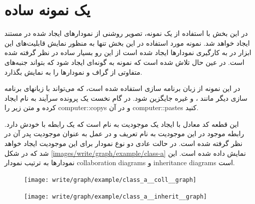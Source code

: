 % 
% 
% 
\section{یک نمونه ساده}

در این بخش با استفاده از یک نمونه، تصویر روشنی از نمودارهای ایجاد شده در مستند
ایجاد خواهد شد. نمونه مورد استفاده در این بخش تنها به منظور نمایش قابلیت‌های این
ابزار در به کارگیری نمودارها ایجاد شده است از این رو بسیار ساده در نظر گرفته شده
است. در عین حال تلاش شده است که نمونه به گونه‌ای ایجاد شود که بتواند جنبه‌های
متفاوتی از گراف و نمودارها را به نمایش بگذارد.


در این نمونه از زبان برنامه سازی  استفاده شده است، که می‌تواند با
زبانهای برنامه سازی دیگر مانند ،  و غیره جایگزین شود. در گام
نخست یک پرونده سرآیند به نام  ایجاد کرده و متن زیر را
\glspl{computer::copy} و در آن \glspl{computer::paste} کنید.


این قطعه کد معادل با ایجاد یک موجودیت به نام  است که یک رابطه با خودش
دارد. رابطه موجود در این موجودیت به نام  تعریف و در
عمل به عنوان موجودیت پدر آن در نظر گرفته شده است. در حالت عادی دو نوع نمودار
برای این موجودیت ایجاد خواهد شد که در شکل \ref{images/write/graph/example/class-a}
نمایش داده شده است. این نمودارها به ترتیب نمودار \glspl{collaboration diagram} و
\glspl{inheritance diagram} است.

\begin{figure}
    \centering
    \texttt{[image: write/graph/example/class\_a\_\_coll\_\_graph]}
    \label{images/write/graph/example/class_a__coll__graph}
\end{figure}

\begin{figure}
    \centering
    \texttt{[image: write/graph/example/class\_a\_\_inherit\_\_graph]}
    \label{images/write/graph/example/class_a__inherit__graph}
\end{figure}

